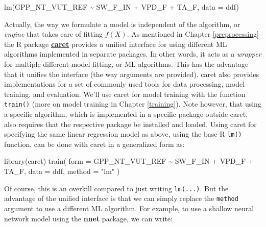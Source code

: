 \documentclass[
]{book}
\newenvironment{Shaded}{\begin{snugshade}}{\end{snugshade}}
\newcommand{\AttributeTok}[1]{\textcolor[rgb]{0.77,0.63,0.00}{#1}}
\newcommand{\FunctionTok}[1]{\textcolor[rgb]{0.00,0.00,0.00}{#1}}
\newcommand{\NormalTok}[1]{#1}
\newcommand{\SpecialCharTok}[1]{\textcolor[rgb]{0.00,0.00,0.00}{#1}}
\newcommand{\StringTok}[1]{\textcolor[rgb]{0.31,0.60,0.02}{#1}}
\begin{document}
\begin{Shaded}
\begin{Highlighting}[]
\FunctionTok{lm}\NormalTok{(GPP\_NT\_VUT\_REF }\SpecialCharTok{\textasciitilde{}}\NormalTok{ SW\_F\_IN }\SpecialCharTok{+}\NormalTok{ VPD\_F }\SpecialCharTok{+}\NormalTok{ TA\_F, }\AttributeTok{data =}\NormalTok{ ddf)}
\end{Highlighting}
\end{Shaded}

Actually, the way we formulate a model is independent of the algorithm, or \emph{engine} that takes care of fitting \(f(X)\). As mentioned in Chapter \ref{preprocessing} the R package \href{https://topepo.github.io/caret/}{\textbf{caret}} provides a unified interface for using different ML algorithms implemented in separate packages. In other words, it acts as a \emph{wrapper} for multiple different model fitting, or ML algorithms. This has the advantage that it unifies the interface (the way arguments are provided). caret also provides implementations for a set of commonly used tools for data processing, model training, and evaluation. We'll use caret for model training with the function \texttt{train()} (more on model training in Chapter \ref{training}). Note however, that using a specific algorithm, which is implemented in a specific package outside caret, also requires that the respective package be installed and loaded. Using caret for specifying the same linear regression model as above, using the base-R \texttt{lm()} function, can be done with caret in a generalized form as:

\begin{Shaded}
\begin{Highlighting}[]
\FunctionTok{library}\NormalTok{(caret)}
\FunctionTok{train}\NormalTok{(}
  \AttributeTok{form =}\NormalTok{ GPP\_NT\_VUT\_REF }\SpecialCharTok{\textasciitilde{}}\NormalTok{ SW\_F\_IN }\SpecialCharTok{+}\NormalTok{ VPD\_F }\SpecialCharTok{+}\NormalTok{ TA\_F, }
  \AttributeTok{data =}\NormalTok{ ddf, }
  \AttributeTok{method =} \StringTok{"lm"}
\NormalTok{)}
\end{Highlighting}
\end{Shaded}

Of course, this is an overkill compared to just writing \texttt{lm(...)}. But the advantage of the unified interface is that we can simply replace the \texttt{method} argument to use a different ML algorithm. For example, to use a shallow neural network model using the \textbf{nnet} package, we can write:
\end{document}
